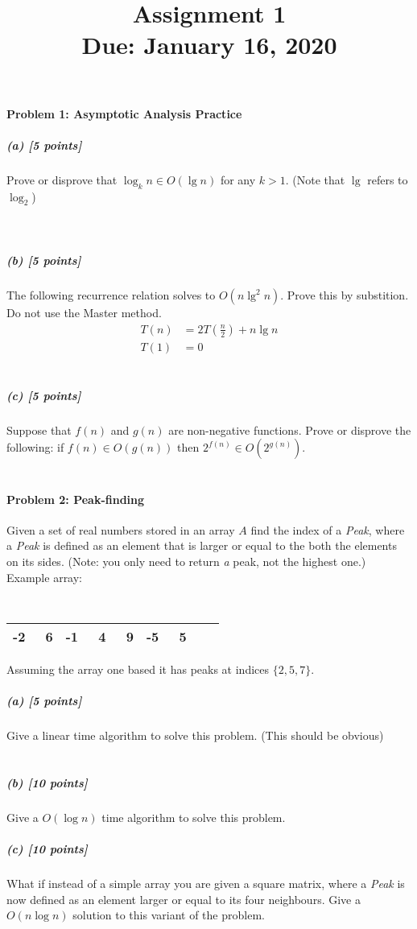 \documentclass[11pt]{article}
\title{\bf Assignment 1 \\[2ex]
\rm\normalsize Due: January 16, 2020}
\date{}
\author{}
\begin{document}
\maketitle

\paragraph{Problem 1: Asymptotic Analysis Practice}
\subparagraph{(a) [5 points]}
Prove or disprove that $\log_k n \in O(\lg n)$ for any $k > 1$. (Note that $\lg$ refers to $\log_2$) \\
\\

\\
\subparagraph{(b) [5 points]}
The following recurrence relation solves to $O(n \lg^2 n)$. Prove this by substition. Do not use the Master method.
\begin{align*}
T(n) &= 2T\left( \frac n2 \right) + n \lg n \\
T(1) &= 0
\end{align*}
\\

\subparagraph{(c) [5 points]}
Suppose that $f(n)$ and $g(n)$ are non-negative functions. Prove or disprove the following: if $f(n) \in O(g(n))$ then $2^{f(n)} \in O(2^{g(n)})$. \\
\\


\paragraph{Problem 2: Peak-finding}
Given a set of real numbers stored in an array $A$ find the index of a {\em Peak}, where a {\em Peak} is defined as an
element that is larger or equal to the both the elements on its sides. (Note: you only need to return {\em a} peak, not
the highest one.)\\

Example array:
                {\tt
                \begin{tabular}{|*{9}{r|}}
                    \hline
                    -2 & \ 6 & -1 & \ 4 & \ 9 & -5 & \ 5  \\
                    \hline
                \end{tabular}
                }

Assuming the array one based it has peaks at indices $\{2,5,7 \}$.

\subparagraph{(a) [5 points]}
Give a linear time algorithm to solve this problem. (This should be obvious) \\
\\


\subparagraph{(b) [10 points]}
Give a $O(\log n)$ time algorithm to solve this problem.
\\


\subparagraph{(c) [10 points]}
What if instead of a simple array you are given a square matrix, where a {\em Peak} is now defined as an element larger
or equal to its four neighbours. Give a $O(n \log n)$ solution to this variant of the problem.
\\

\end{document}

